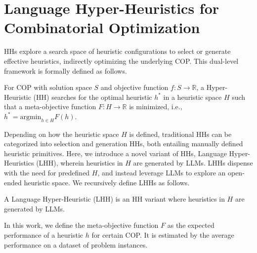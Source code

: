 
\section{Language Hyper-Heuristics for Combinatorial Optimization}
HHs explore a search space of heuristic configurations to select or generate effective heuristics, indirectly optimizing the underlying COP. This dual-level framework is formally defined as follows.

\begin{definition}
For COP with solution space \( S \) and objective function \( f: S \rightarrow \mathbb{R} \), a Hyper-Heuristic (HH) searches for the optimal heuristic \( h^* \) in a heuristic space \( H \) such that a meta-objective function \( F: H \rightarrow \mathbb{R} \) is minimized, i.e., \( h^* = \mathrm{argmin}_{h \in H} F(h) \).
\end{definition}

Depending on how the heuristic space \( H \) is defined, traditional HHs can be categorized into selection and generation HHs, both entailing manually defined heuristic primitives. Here, we introduce a novel variant of HHs, Language Hyper-Heuristics (LHH), wherein heuristics in \( H \) are generated by LLMs. LHHs dispense with the need for predefined \( H \), and instead leverage LLMs to explore an open-ended heuristic space. We recursively define LHHs as follows.
\begin{definition}
    A Language Hyper-Heuristic (LHH) is an HH variant where heuristics in \( H \) are generated by LLMs.
\end{definition}


In this work, we define the meta-objective function \( F \) as the expected performance of a heuristic \( h \) for certain COP. It is estimated by the average performance on a dataset of problem instances.

